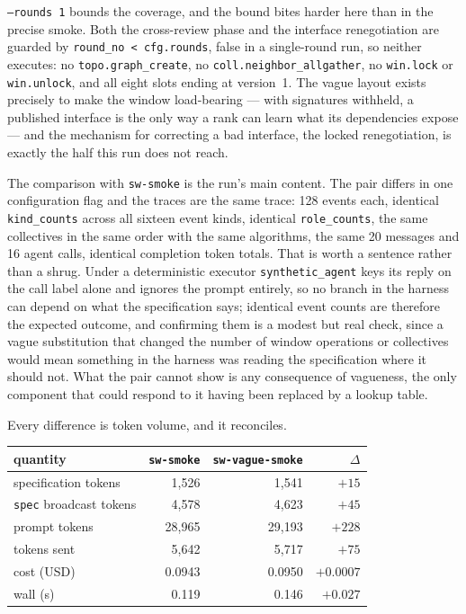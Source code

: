\documentclass[11pt]{article}
\begin{document}
\texttt{--rounds 1} bounds the coverage, and the bound bites harder here than in the precise
smoke. Both the cross-review phase and the interface renegotiation are guarded by
\texttt{round\_no < cfg.rounds}, false in a single-round run, so neither executes: no
\texttt{topo.graph\_create}, no \texttt{coll.neighbor\_allgather}, no \texttt{win.lock} or
\texttt{win.unlock}, and all eight slots ending at version~1. The vague layout exists precisely
to make the window load-bearing --- with signatures withheld, a published interface is the only
way a rank can learn what its dependencies expose --- and the mechanism for correcting a bad
interface, the locked renegotiation, is exactly the half this run does not reach.

The comparison with \texttt{sw-smoke} is the run's main content. The pair differs in one
configuration flag and the traces are the same trace: 128 events each, identical
\texttt{kind\_counts} across all sixteen event kinds, identical \texttt{role\_counts}, the same
collectives in the same order with the same algorithms, the same 20 messages and 16 agent
calls, identical completion token totals. That is worth a sentence rather than a shrug. Under
a deterministic executor \texttt{synthetic\_agent} keys its reply on the call label alone and
ignores the prompt entirely, so no branch in the harness can depend on what the specification
says; identical event counts are therefore the expected outcome, and confirming them is a
modest but real check, since a vague substitution that changed the number of window operations
or collectives would mean something in the harness was reading the specification where it
should not. What the pair cannot show is any consequence of vagueness, the only component that
could respond to it having been replaced by a lookup table.

Every difference is token volume, and it reconciles.

\begin{center}
\begin{tabular}{@{}lrrr@{}}
\toprule
quantity & \texttt{sw-smoke} & \texttt{sw-vague-smoke} & $\Delta$ \\
\midrule
specification tokens & 1{,}526 & 1{,}541 & $+15$ \\
\texttt{spec} broadcast tokens & 4{,}578 & 4{,}623 & $+45$ \\
prompt tokens & 28{,}965 & 29{,}193 & $+228$ \\
tokens sent & 5{,}642 & 5{,}717 & $+75$ \\
cost (USD) & 0.0943 & 0.0950 & $+0.0007$ \\
wall (s) & 0.119 & 0.146 & $+0.027$ \\
\bottomrule
\end{tabular}
\end{center}
\end{document}
